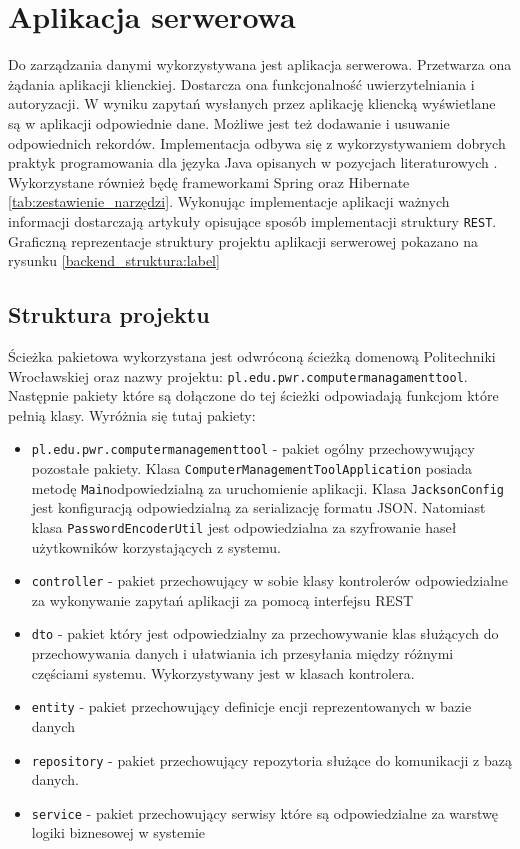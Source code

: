 \section{Aplikacja serwerowa}
Do zarządzania danymi wykorzystywana jest aplikacja serwerowa. Przetwarza ona żądania aplikacji klienckiej. Dostarcza ona funkcjonalność uwierzytelniania i autoryzacji. W wyniku zapytań wysłanych przez aplikację kliencką wyświetlane są w aplikacji odpowiednie dane. Możliwe jest też dodawanie i usuwanie odpowiednich rekordów. Implementacja odbywa się z wykorzystywaniem dobrych praktyk programowania dla języka Java opisanych w pozycjach literaturowych \cite{JTZ, JEP}. Wykorzystane również będę frameworkami Spring oraz Hibernate \ref{tab:zestawienie_narzędzi}. Wykonując implementacje aplikacji ważnych informacji dostarczają artykuły \cite{rest, restweb} opisujące sposób implementacji struktury \texttt{REST}. Graficzną reprezentacje struktury projektu aplikacji serwerowej pokazano na rysunku \ref{backend_struktura:label}

\subsection{Struktura projektu}
Ścieżka pakietowa wykorzystana jest odwróconą ścieżką domenową Politechniki Wrocławskiej oraz nazwy projektu: \texttt{pl.edu.pwr.computermanagamenttool}. Następnie pakiety które są dołączone do tej ścieżki odpowiadają funkcjom które pełnią klasy. Wyróżnia się tutaj pakiety:
\begin{itemize} %
\item \texttt{pl.edu.pwr.computermanagementtool} - pakiet ogólny przechowywujący pozostałe pakiety. Klasa \texttt{ComputerManagementToolApplication} posiada metodę \texttt{Main}odpowiedzialną za uruchomienie aplikacji. Klasa \texttt{JacksonConfig} jest konfiguracją odpowiedzialną za serializację formatu JSON. Natomiast klasa \texttt{PasswordEncoderUtil} jest odpowiedzialna za szyfrowanie haseł użytkowników korzystających z systemu.
\item \texttt{controller} - pakiet przechowujący w sobie klasy kontrolerów odpowiedzialne za wykonywanie zapytań aplikacji za pomocą interfejsu REST
\item \texttt{dto} - pakiet który jest odpowiedzialny za przechowywanie klas służących do przechowywania danych i ułatwiania ich przesyłania między różnymi częściami systemu. Wykorzystywany jest w klasach kontrolera.
\item \texttt{entity} - pakiet przechowujący definicje encji reprezentowanych w bazie danych
\item \texttt{repository} - pakiet przechowujący repozytoria służące do komunikacji z bazą danych.
\item \texttt{service} - pakiet przechowujący serwisy które są odpowiedzialne za warstwę logiki biznesowej w systemie
\end{itemize}


